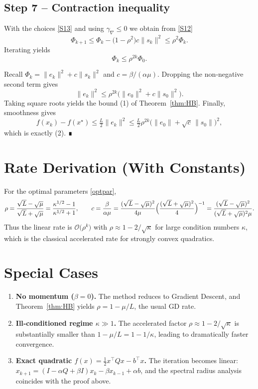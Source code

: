 \documentclass{article}
\begin{document}
\subsection*{Step 7 – Contraction inequality}
With the choices \eqref{S13} and using $\gamma_{\nabla}\le0$ we obtain from
\eqref{S12}
\[
\Phi_{k+1}\le \Phi_{k} -\bigl(1-\rho^{2}\bigr)c\|s_{k}\|^{2}
           \le \rho^{2}\Phi_{k}.
\tag{S18}
\]
Iterating yields
\[
\Phi_{k}\le \rho^{2k}\Phi_{0}.
\tag{S19}
\]

Recall $\Phi_{k}= \|e_{k}\|^{2}+c\|s_{k}\|^{2}$ and $c=\beta/(\alpha\mu)$.  Dropping the
non‑negative second term gives
\[
\|e_{k}\|^{2}\le \rho^{2k}\bigl(\|e_{0}\|^{2}+c\|s_{0}\|^{2}\bigr).
\tag{S20}
\]
Taking square roots yields the bound (1) of Theorem~\ref{thm:HB}.
Finally, smoothness gives
\[
f(x_{k})-f(x^{\star})\le \tfrac{L}{2}\|e_{k}\|^{2}
   \le \tfrac{L}{2}\rho^{2k}
      \bigl(\|e_{0}\|+\sqrt{c}\,\|s_{0}\|\bigr)^{2},
\]
which is exactly (2).  ∎

\section*{Rate Derivation (With Constants)}
For the optimal parameters \eqref{optpar},
\[
\rho = \frac{\sqrt{L}-\sqrt{\mu}}{\sqrt{L}+\sqrt{\mu}}
      = \frac{\kappa^{1/2}-1}{\kappa^{1/2}+1},
\qquad
c = \frac{\beta}{\alpha\mu}
   = \frac{(\sqrt{L}-\sqrt{\mu})^{2}}{4\mu}
     \Bigl(\frac{(\sqrt{L}+\sqrt{\mu})^{2}}{4}\Bigr)^{-1}
   = \frac{(\sqrt{L}-\sqrt{\mu})^{2}}{(\sqrt{L}+\sqrt{\mu})^{2}\mu } .
\]
Thus the linear rate is $\mathcal{O}\bigl(\rho^{k}\bigr)$ with
$\rho \approx 1-2/\sqrt{\kappa}$ for large condition numbers $\kappa$,
which is the classical accelerated rate for strongly convex quadratics.

\section*{Special Cases}
\begin{enumerate}
\item \textbf{No momentum ($\beta=0$).}  The method reduces to Gradient Descent,
and Theorem~\ref{thm:HB} yields $\rho=1-\mu/L$, the usual GD rate.
\item \textbf{Ill‑conditioned regime $\kappa\gg1$.}
  The accelerated factor $\rho\approx 1-2/\sqrt{\kappa}$ is substantially
  smaller than $1-\mu/L = 1-1/\kappa$, leading to dramatically faster
  convergence.
\item \textbf{Exact quadratic $f(x)=\tfrac12 x^{\top}Qx -b^{\top}x$.}
  The iteration becomes linear: $x_{k+1}= (I-\alpha Q+\beta I)x_{k}
   -\beta x_{k-1}+ \alpha b$, and the spectral radius analysis coincides
  with the proof above.
\end{enumerate}

\end{document}
